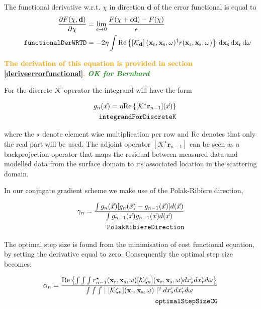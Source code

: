 \documentclass[10pt,a4paper]{article}
\newcommand{\partder}[2]{\ensuremath{\frac{\partial #1}{\partial #2}}}
\newcommand{\df}[1]{\, \ensuremath{\mbox{d}#1}}
\newcommand{\real}[1]{\text{Re} \left\{ #1 \right\}}
\newcommand{\newstmtwo}[1]{\textcolor{orange}{\textbf{#1}}}
\newcommand{\brok}{\textcolor{ForestGreen}{\textit{\textbf{OK for Bernhard}}}}
\newcommand{\xs}{\mathbf{x}_\text{s}}
\newcommand{\xr}{\mathbf{x}_\text{r}}
\begin{document}
The functional derivative w.r.t. $\chi$ in direction $\mathbf{d}$ of
the error functional is equal to
\begin{align}
\label{eq:functionalDerWRTD}
\partder{F(\mathbf{\chi}, \mathbf{d})}{\mathbf{\chi}} & =
\lim_{\epsilon \rightarrow 0} \frac{F(\mathbf{\chi} + \epsilon
\mathbf{d}) - F(\mathbf{\chi})}{\epsilon} \\
\tag*{\texttt{functionalDerWRTD}}
& = -2 \eta \int \real{\left[\mathcal{K}_\mathbf{d} \right](\xr, \xs,
\omega)^{\dagger} r (\xr, \xs, \omega)} \df{\xs} \df{\xr} \df{\omega}
\end{align}

\newstmtwo{The derivation of this equation is provided in section
\ref{deriveerrorfunctional}.}
{\brok}

For the discrete $\mathcal{K}$ operator the integrand will have the form

\begin{align} \label{eq:integrandForDiscreteK} g_n(\vec{x}) = \eta
\real{[\mathcal{K}^\star\mathbf{r}_{n-1}](\vec{x})}\\
\tag*{\texttt{integrandForDiscreteK}}
\end{align}

where the $\star$ denote element wise multiplication per row and Re
denotes that only the real part will be used.
The adjoint operator $[\mathcal{K}^\star\mathbf{r}_{n-1}]$ can be seen
as a backprojection operator that maps the residual between measured
data and modelled data from the surface domain to its associated
location in the scattering domain.

In our conjugate gradient scheme we make use of the
Polak-Ribi$\grave{e}$re direction,

\begin{align} \label{eq:PolakRibiereDirection} \gamma_n = \frac{\int
g_n(\vec{x})[g_n(\vec{x})-g_{n-1}(\vec{x})]d(\vec{x})}{\int
g_{n-1}(\vec{x}) g_{n-1}(\vec{x})d(\vec{x})}\\
\tag*{\texttt{PolakRibiereDirection}}
\end{align}

The optimal step size is found from the minimisation of cost
functional equation, by setting the derivative equal to zero.
Consequently the optimal step size becomes:

\begin{align} \label{eq:optimalStepSizeCG} \alpha_n = \frac {\real {\int \int
\int r^{\star}_{n-1}(\mathbf{x_\text{r}},\mathbf{x_\text{s}},\omega)[\mathcal{K}
\zeta_n](\mathbf{x_\text{r}},\mathbf{x_\text{s}},\omega)d\vec{x_s}d\vec{x_r}d\omega}}{\int
\int \int \mid[\mathcal{K}
\zeta_n](\mathbf{x_\text{r}},\mathbf{x_\text{s}},\omega) \mid^2
d\vec{x_s}d\vec{x_r}d\omega}\\
\tag*{\texttt{optimalStepSizeCG}}
\end{align}
\end{document}
